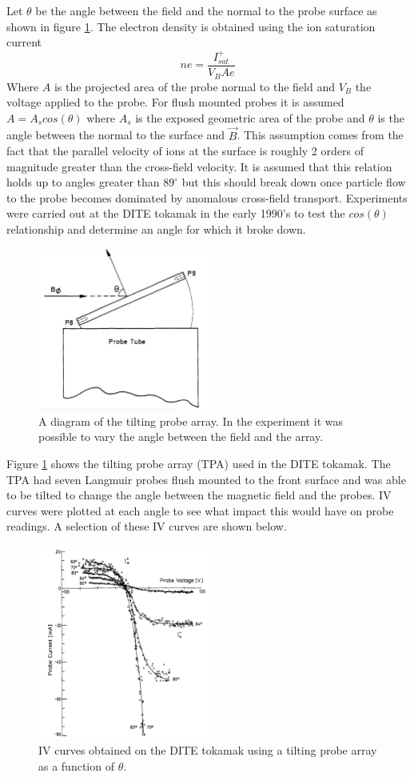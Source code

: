 \documentclass[12pt]{article}
\def\be{\begin{equation}}
\def\ee{\end{equation}}
\begin{document}
Let $\theta$ be the angle between the field and the normal to the probe surface as shown in figure \ref{fig:angle}. The electron density is obtained using the ion saturation current 
\be
ne = \frac{I^+_{sat}}{V_B A e} 
\ee
Where $A$ is the projected area of the probe normal to the field and $V_B$ the voltage applied to the probe. For flush mounted probes it is assumed $A = A_s cos(\theta)$ where $A_s$ is the exposed geometric area of the probe and $\theta$ is the angle between the normal to the surface and $\vec{B}$. This assumption comes from the fact that the parallel velocity of ions at the surface is roughly 2 orders of magnitude greater than the cross-field velocity. It is assumed that this relation holds up to angles greater than $89 ^{\circ}$ but this should break down once particle flow to the probe becomes dominated by anomalous cross-field transport. Experiments were carried out at the DITE tokamak in the early 1990's to test the $cos(\theta)$ relationship and determine an angle for which it broke down. 
\begin{figure}[H]
\centering
\includegraphics[width=0.5\textwidth]{angle}
\caption{A diagram of the tilting probe array. In the experiment it was possible to vary the angle between the field and the array. \cite{tilting}}
\label{fig:angle}
\end{figure}
Figure \ref{fig:angle} shows the tilting probe array (TPA) used in the DITE tokamak. The TPA had seven Langmuir probes flush mounted to the front surface and was able to be tilted to change the angle between the magnetic field and the probes. IV curves were plotted at each angle to see what impact this would have on probe readings. A selection of these IV curves are shown below. 
\begin{figure}[H]
\centering
\includegraphics[width=0.5\textwidth]{lpangle}
\caption{IV curves obtained on the DITE tokamak using a tilting probe array as a function of $\theta$.  \cite{tilting}}
\end{figure}
\end{document}
